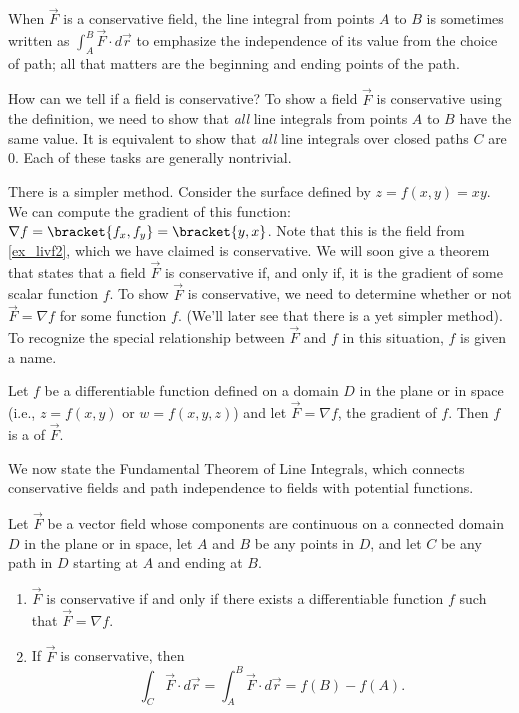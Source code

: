 When $\vec F$ is a conservative field, the line integral from points $A$ to $B$ is sometimes written as $\int_A^B\vec F\cdot d\vec r$ to emphasize the independence of its value from the choice of path; all that matters are the beginning and ending points of the path.

How can we tell if a field is conservative? To show a field $\vec F$ is conservative using the definition, we need to show that \emph{all} line integrals from points $A$ to $B$ have the same value. It is equivalent to show that \emph{all} line integrals over closed paths $C$ are 0. Each of these tasks are generally nontrivial.

There is a simpler method. Consider the surface defined by $z = f(x,y) = xy$. We can compute the gradient of this function: $\nabla f =\bracket{f_x, f_y}=\bracket{y, x}$. Note that this is the field from \autoref{ex_livf2}, which we have claimed is conservative. We will soon give a theorem that states that a field $\vec F$ is conservative if, and only if, it is the gradient of some scalar function $f$. To show $\vec F$ is conservative, we need to determine whether or not $\vec F = \nabla f$ for some function $f$. (We'll later see that there is a yet simpler method). To recognize the special relationship between $\vec F$ and $f$ in this situation, $f$ is given a name.

{Let $f$ be a differentiable function defined on a  domain $D$ in the plane or in space (i.e., $z = f(x,y)$ or $w = f(x,y,z)$) and let $\vec F = \nabla f$, the gradient of $f$. Then $f$ is a  of $\vec F$.
}

We now state the Fundamental Theorem of Line Integrals, which connects conservative fields and path independence to fields with potential functions. 

{Let $\vec F$ be a vector field whose components are continuous on a connected domain $D$ in the plane or in space, let $A$ and $B$ be any points in $D$, and let $C$ be any path in $D$ starting at $A$ and ending at $B$.
\begin{enumerate}
	\item $\vec F$ is conservative if and only if there exists a differentiable function $f$ such that $\vec F = \nabla f$. 
	\item	If $\vec F$ is conservative, then 
	\[\int_C\vec F\cdot d\vec r = \int_A^B \vec F\cdot d\vec r = f(B) - f(A).\]
\end{enumerate}
}

